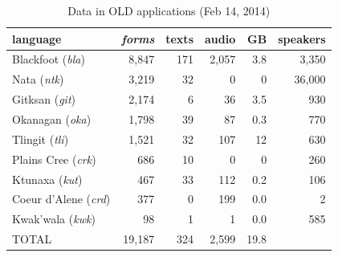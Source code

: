 \documentclass[11pt]{article}
\begin{document}
\begin{table}[h]
 \begin{center}
     \scriptsize
\begin{tabular}{lrrrrr}

      \toprule
      language &                     \emph{forms}  & texts & audio & GB   & speakers \\
      \midrule
      Blackfoot (\textit{bla}) &     8,847  & 171   & 2,057 & 3.8  & 3,350    \\ %
      Nata (\textit{ntk}) &          3,219  & 32    & 0     & 0    & 36,000   \\ %
      Gitksan (\textit{git}) &       2,174  & 6     & 36    & 3.5  & 930      \\ %
      Okanagan (\textit{oka}) &      1,798  & 39    & 87    & 0.3  & 770      \\ %
      Tlingit (\textit{tli}) &       1,521  & 32    & 107   & 12   & 630      \\ %
      Plains Cree (\textit{crk}) &   686    & 10    & 0     & 0    & 260      \\ %
      Ktunaxa (\textit{kut}) &       467    & 33    & 112   & 0.2  & 106      \\ %
      Coeur d'Alene (\textit{crd}) & 377    & 0     & 199   & 0.0  & 2        \\ %
      Kwak'wala (\textit{kwk}) &     98     & 1     & 1     & 0.0  & 585      \\ %
      TOTAL &                        19,187 & 324   & 2,599 & 19.8 &         \\ %
      \bottomrule

\end{tabular}
\caption{Data in OLD applications (Feb 14, 2014)}
\label{old-data}
 \end{center}
 \normalsize
\end{table}
\end{document}
